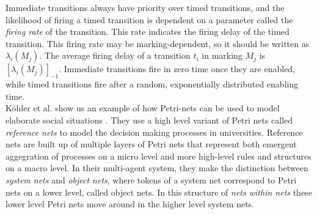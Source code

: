 \documentclass[11pt]{book}
\begin{document}
Immediate transitions always have priority over timed transitions, and  the likelihood of firing a timed transition is dependent on a parameter called the \emph{firing rate} of the transition. This rate indicates the firing delay of the timed transition. This firing rate may be marking-dependent, so it should be written as $\lambda_i(M_j)$.  The average firing delay of a transition $t_i$ in marking $M_j$ is $[\lambda_i(M_j)]_{-1}$. Immediate transitions fire in zero time once they are enabled, while timed transitions fire after a random, exponentially distributed enabling time.\\
K\"{o}hler et al. show us an example of how Petri-nets can be used to model elaborate social situations \cite{Köhler03modellingsocial}. They use a high level variant of Petri nets called \emph{reference nets} to model the decision making processes in universities. Reference nets are built up of multiple layers of Petri nets that represent both emergent aggegration of processes on a micro level and more high-level rules and structures on a macro level. In their multi-agent system, they make the distinction between \emph{system nets} and \emph{object nets}, where tokens of a system net correspond to Petri nets on a lower level, called object nets. In this structure of \emph{nets within nets} these lower level Petri nets move around in the higher level system nets. 
\end{document}
